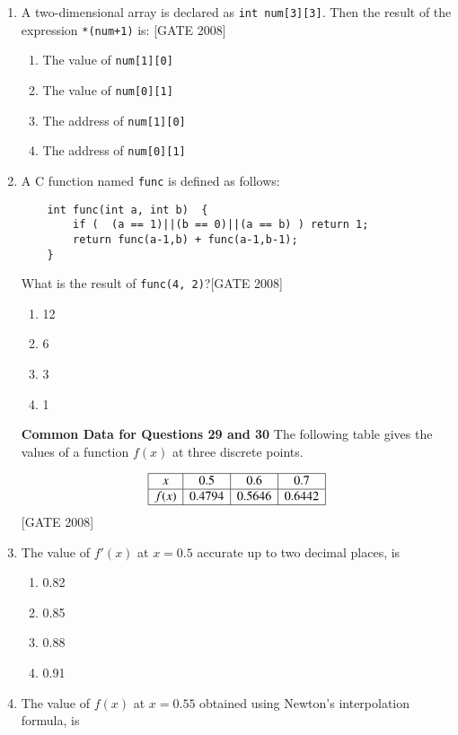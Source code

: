 \documentclass[journal,12pt,onecolumn]{IEEEtran}
\theoremstyle{remark}
\begin{document}
\begin{enumerate}
\item A two-dimensional array is declared as \texttt{int num[3][3]}. Then the result of the expression \texttt{*(num+1)} is:
\hfill{[GATE 2008]}

\begin{enumerate}
    \item The value of \texttt{num[1][0]}
    \item The value of \texttt{num[0][1]}
    \item The address of \texttt{num[1][0]}
    \item The address of \texttt{num[0][1]}
\end{enumerate}

\item A C function named \texttt{func} is defined as follows:
\begin{verbatim}
    int func(int a, int b)  {
        if (  (a == 1)||(b == 0)||(a == b) ) return 1;
        return func(a-1,b) + func(a-1,b-1);
    }
\end{verbatim}


What is the result of \texttt{func(4, 2)}?\hfill{[GATE 2008]}

\begin{multicols}{4}
\begin{enumerate}
    \item 12
    \item 6
    \item 3
    \item 1
\end{enumerate}
\end{multicols}
 \textbf{Common Data for Questions 29 and 30}
The following table gives the values of a function $f(x)$ at three discrete points.

\[
\begin{array}{|c|c|c|c|}
\hline
x & 0.5 & 0.6 & 0.7 \\
\hline
f(x) & 0.4794 & 0.5646 & 0.6442 \\
\hline
\end{array}
\]
\hfill{[GATE 2008]}
\item The value of $f'(x)$ at $x = 0.5$ accurate up to two decimal places, is

\begin{multicols}{4}
\begin{enumerate}
    \item 0.82
    \item 0.85
    \item 0.88
    \item 0.91
\end{enumerate}
\end{multicols}
\item The value of $f(x)$ at $x = 0.55$ obtained using Newton's interpolation formula, is


\end{enumerate}
\end{document}
